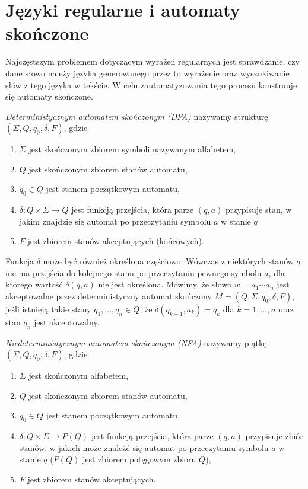 \section{Języki regularne i automaty skończone}

Najczęstszym problemem dotyczącym wyrażeń regularnych jest sprawdzanie, czy dane słowo należy języka generowanego przez to wyrażenie oraz wyszukiwanie słów z tego języka w tekście. W celu zautomatyzowania tego procesu konstruuje się automaty skończone.
\begin{definition}
    \emph{Deterministycznym automatem skończonym (DFA)} nazywamy strukturę $(\Sigma, Q, q_0, \delta, F)$, gdzie
    \begin{enumerate}
        \item $\Sigma$ jest skończonym zbiorem symboli nazywanym alfabetem,
        \item $Q$ jest skończonym zbiorem stanów automatu,
        \item $q_0 \in Q$ jest stanem początkowym automatu,
        \item $\delta:Q\times \Sigma\to Q$ jest funkcją przejścia, która parze $(q,a)$ przypisuje stan, w jakim znajdzie się automat po przeczytaniu symbolu $a$ w stanie $q$
        \item $F$ jest zbiorem stanów akceptujących (końcowych).
    \end{enumerate}
\end{definition}
Funkcja $\delta$ może być również określona częściowo. Wówczas z niektórych stanów $q$ nie ma przejścia do kolejnego stanu po przeczytaniu pewnego symbolu $a$, dla którego wartość $\delta(q,a)$ nie jest określona. Mówimy, że słowo $w=a_1\dotsm a_n$ jest akceptowalne przez deterministyczny automat skończony $M=(Q,\Sigma,q_0,\delta,F)$, jeśli istnieją takie stany $q_1,\dotsc,q_n\in Q$, że $\delta(q_{k-1},a_k)=q_k$ dla $k=1,\dotsc,n$ oraz stan $q_n$ jest akceptowalny.
\begin{definition}
    \emph{Niedeterministycznym automatem skończonym (NFA)} nazywamy piątkę $(\Sigma, Q, q_0, \delta, F)$, gdzie
    \begin{enumerate}
        \item $\Sigma$ jest skończonym alfabetem,
        \item $Q$ jest skończonym zbiorem stanów automatu,
        \item $q_0 \in Q$ jest stanem początkowym automatu,
        \item $\delta:Q\times \Sigma\to P(Q)$ jest funkcją przejścia, która parze $(q,a)$ przypisuje zbiór stanów, w jakich może znaleźć się automat po przeczytaniu symbolu $a$ w stanie $q$ ($P(Q)$ jest zbiorem potęgowym zbioru $Q$),
        \item $F$ jest zbiorem stanów akceptujących.
    \end{enumerate}
\end{definition}
